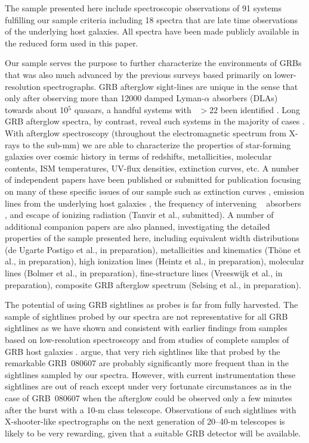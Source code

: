 \documentclass{aa}    %
\begin{document}
The sample presented here include spectroscopic observations of 91 systems
fulfilling our sample criteria including 18 spectra that are late time
observations of the underlying host galaxies. All spectra have been made
publicly available in the reduced form used in this paper.

Our sample serves the purpose to further characterize the environments of GRBs
that was also much advanced by the previous surveys based primarily on
lower-resolution spectrographs. GRB afterglow sight-lines are unique in the
sense that only after observing more than 12000 damped Lyman-$\alpha$ absorbers
(DLAs) towards about 10$^5$ quasars, a handful systems with
\nh~$ > 22$ been identified \citep[e.g., five
in][]{Noterdaeme2012b}. Long GRB afterglow spectra, by contrast, reveal such
systems in the majority of cases \citep[][and this work]{Jakobsson2006b,
	Fynbo2009, Cucchiara2015}. With afterglow spectroscopy (throughout the
electromagnetic spectrum from X-rays to the sub-mm) we are able to characterize
the properties of star-forming galaxies over cosmic history in terms of
redshifts, metallicities, molecular contents, ISM temperatures, UV-flux
densities, extinction curves, etc.  A number of independent papers have been
published or submitted for publication focusing on many of these specific issues
of our sample such as extinction curves \citep[][see also \citealt{Fynbo2014,
	Heintz2017}]{Japelj2015, Zafar17}, emission lines from the underlying host
galaxies \citep{Kruhler2015}, the frequency of intervening \mgii~ absorbers
\citep{Christensen2017}, and escape of ionizing radiation (Tanvir et al.,
submitted). A number of additional companion papers are also planned,
investigating the detailed properties of the sample presented here, including
equivalent width distributions (de Ugarte Postigo et al., in preparation),
metallicities and kinematics (Th{\"o}ne et al., in preparation), high ionization
lines (Heintz et al., in preparation), molecular lines (Bolmer et al., in
preparation), fine-structure lines (Vreeswijk et al., in preparation), composite
GRB afterglow spectrum (Selsing et al., in preparation).

The potential of using GRB sightlines as probes is far from fully harvested. The
sample of sightlines probed by our spectra are not representative for all GRB
sightlines as we have shown and consistent with earlier findings from samples
based on low-resolution spectroscopy \citep[e.g.,][]{Fynbo2009} and from studies
of complete samples of GRB host galaxies \citep{Hjorth2012, Covino2013,
	Perley2016}. \cite{Kruhler2013} argue, that very rich sightlines like that
probed by the remarkable GRB~080607 \citep{Prochaska2009} are probably
significantly more frequent than in the sightlines sampled by our spectra.
However, with current instrumentation these sightlines are out of reach except
under very fortunate circumstances as in the case of GRB~080607 when the
afterglow could be observed only a few minutes after the burst with a 10-m class
telescope. Observations of such sightlines with X-shooter-like spectrographs on
the next generation of 20--40-m telescopes is likely to be very rewarding, given
that a suitable GRB detector will be available.
\end{document}
